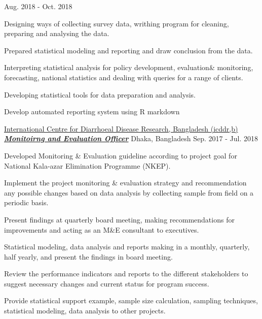 \begin{cventries}
    {Aug. 2018 - Oct. 2018} %
    {
      \begin{cvitems} %
	\item{Designing ways of collecting survey data, writhing program for cleaning, preparing and analysing the data.} 
	\item{Prepared statistical modeling and reporting and draw conclusion from the data.}
	\item{Interpreting statistical analysis for policy development, evaluation\& monitoring, forecasting, national statistics and dealing with queries for a range of clients.}
	\item{Developing statistical tools for data preparation and analysis.}
	\item{Develop automated reporting system using R markdown}
      \end{cvitems}
    }

  \cventry
    {\href{http://www.icddrb.org/}{International Centre for Diarrhoeal Disease Research, Bangladesh (icddr,b)}} %
   {\href{https://www.dropbox.com/sh/bg88dnmjpcicdmn/AACdPh__4UdzmbZgx1FtOz3sa?dl=0}{\textbf {\textit {Monitoirng and Evaluation Officer}}}} 
    {Dhaka, Bangladesh} %
    {Sep. 2017 - Jul. 2018} %
    {
      \begin{cvitems} %
	\item{Developed Monitoring \& Evaluation guideline according to project goal for National Kala-azar Elimination Programme (NKEP).}
	\item{Implement the project monitoring \& evaluation strategy and recommendation any possible changes based on data analysis by collecting sample from field on a periodic basis.} 
	\item{Present findings at quarterly board meeting, making recommendations for improvements and acting as an M\&E consultant to executives.} 
	\item{Statistical modeling, data analysis and reports making in a monthly, quarterly, half yearly, and present the findings in board meeting.}
	\item{Review the performance indicators and reports to the different stakeholders to suggest necessary changes and current status for program success.}
	\item{Provide statistical support example, sample size calculation, sampling techniques, statistical modeling, data analysis to other projects.}
      \end{cvitems}
    }


\end{cventries}
